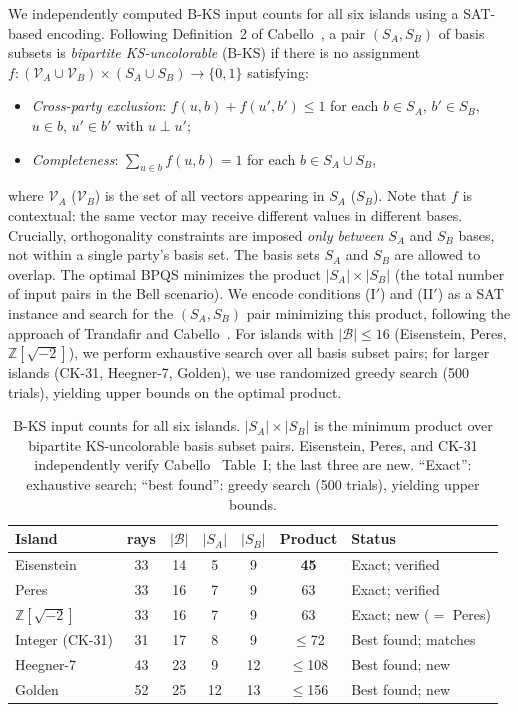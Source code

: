 \documentclass[12pt,a4paper]{article}
\newcommand{\Z}{\mathbb{Z}}
\begin{document}
We independently computed B-KS input counts for all six islands using a SAT-based encoding. Following Definition~2 of Cabello~\cite{Cabello2024bipartite}, a pair $(S_A, S_B)$ of basis subsets is \emph{bipartite KS-uncolorable} (B-KS) if there is no assignment $f: (\mathcal{V}_A \cup \mathcal{V}_B) \times (S_A \cup S_B) \to \{0,1\}$ satisfying:
\begin{itemize}
    \item[(I\,$'$)] \emph{Cross-party exclusion}: $f(u,b) + f(u',b') \leq 1$ for each $b \in S_A$, $b' \in S_B$, $u \in b$, $u' \in b'$ with $u \perp u'$;
    \item[(II\,$'$)] \emph{Completeness}: $\sum_{u \in b} f(u,b) = 1$ for each $b \in S_A \cup S_B$,
\end{itemize}
where $\mathcal{V}_A$ ($\mathcal{V}_B$) is the set of all vectors appearing in $S_A$ ($S_B$). Note that $f$ is contextual: the same vector may receive different values in different bases. Crucially, orthogonality constraints are imposed \emph{only between} $S_A$ and $S_B$ bases, not within a single party's basis set. The basis sets $S_A$ and $S_B$ are allowed to overlap. The optimal BPQS minimizes the product $|S_A| \times |S_B|$ (the total number of input pairs in the Bell scenario). We encode conditions (I$'$) and (II$'$) as a SAT instance and search for the $(S_A, S_B)$ pair minimizing this product, following the approach of Trandafir and Cabello~\cite{TrandafirCabello2025optimal}. For islands with $|\mathcal{B}| \leq 16$ (Eisenstein, Peres, $\Z[\sqrt{-2}]$), we perform exhaustive search over all basis subset pairs; for larger islands (CK-31, Heegner-7, Golden), we use randomized greedy search (500 trials), yielding upper bounds on the optimal product.

\begin{table}[ht]
\centering
\caption{B-KS input counts for all six islands. $|S_A| \times |S_B|$ is the minimum product over bipartite KS-uncolorable basis subset pairs. Eisenstein, Peres, and CK-31 independently verify Cabello~\cite{Cabello2025simplest} Table~I; the last three are new. ``Exact'': exhaustive search; ``best found'': greedy search (500 trials), yielding upper bounds.}
\label{tab:bpqs}
\begin{tabular}{lcccccl}
\toprule
Island & rays & $|\mathcal{B}|$ & $|S_A|$ & $|S_B|$ & Product & Status \\
\midrule
Eisenstein & 33 & 14 & 5 & 9 & \textbf{45} & Exact; verified \\
Peres & 33 & 16 & 7 & 9 & 63 & Exact; verified \\
$\Z[\sqrt{-2}]$ & 33 & 16 & 7 & 9 & 63 & Exact; new ($=$ Peres) \\
Integer (CK-31) & 31 & 17 & 8 & 9 & $\leq$72 & Best found; matches~\cite{Cabello2025simplest} \\
Heegner-7 & 43 & 23 & 9 & 12 & $\leq$108 & Best found; new \\
Golden & 52 & 25 & 12 & 13 & $\leq$156 & Best found; new \\
\bottomrule
\end{tabular}
\end{table}
\end{document}
